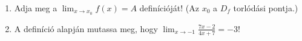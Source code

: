 \documentclass[11pt]{scrartcl}
\begin{document}
\begin{enumerate}
	\item Adja meg a $\lim_{x \to x_0} f(x) = A$ definícióját! (Az $x_0$ a
	      $D_f$ torlódási pontja.)

	\item A definíció alapján mutassa meg, hogy
	      \(\displaystyle \lim_{x \to -1} \frac{7x - 2}{4x + 7} = -3\)!
\end{enumerate}
\end{document}
